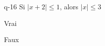 \begin{truefalse}{q-16}
Si $|x+2|\leq 1$, alors $|x|\leq 3$
\item* Vrai
\item Faux
\end{truefalse}

